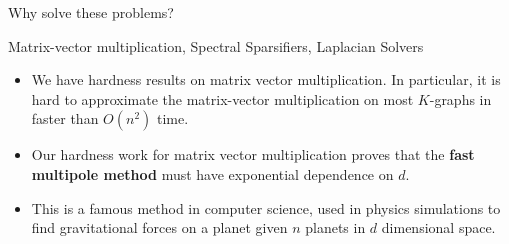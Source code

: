 \begin{frame}{Why solve these problems?}

  {\color{red}Matrix-vector multiplication}, {\color{darkblue}Spectral
  Sparsifiers}, {\color{darkgreen} Laplacian Solvers}
  \begin{itemize} 
    \item We have hardness results on {\color{red}matrix vector
      multiplication.} In particular, it is hard to approximate the
      matrix-vector multiplication on most $K$-graphs in faster than
      $O(n^2)$  time.
    \item Our hardness work for {\color{red}matrix vector multiplication} proves that the \textbf{fast
  multipole method} must have exponential dependence on $d$. 
  \item This is a famous method in computer science, used in physics
    simulations to find gravitational forces on a planet given $n$
      planets in $d$ dimensional space.
  \end{itemize}
\end{frame}

